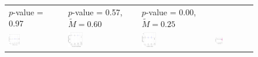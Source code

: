 \documentclass[12pt]{article}
\begin{document}
\begin{figure}[!h]
{\begin{tabular}{C{3.8cm}C{3.8cm}C{3.8cm}C{3.8cm}}
   \citet{Schafer2021} \newline $p$-value = 0.97  &
   \citet{Schuit2017} \newline  $p$-value = 0.57, $\tilde{M} = 0.60$ &
      \citet{Trounstine2020} \newline $p$-value = 0.00, $\tilde{M} = 0.25$ \\
   \hspace{-2em}  \includegraphics[width = 0.22\textwidth]{figure/placebo_honest/Pierskalla_honest_placebo.png} &  
   \hspace{-2em}\includegraphics[width = 0.22\textwidth]{figure/placebo/schafer_placebo.png} &
   \hspace{-2em}\includegraphics[width = 0.22\textwidth]{figure/placebo_honest/Schuit_honest_placebo.png} &
    \hspace{-2em} \includegraphics[width = 0.22\textwidth]{figure/placebo_honest/trounstine_honest_placebo.png} \\


\end{tabular}}
\end{figure}
\end{document}
